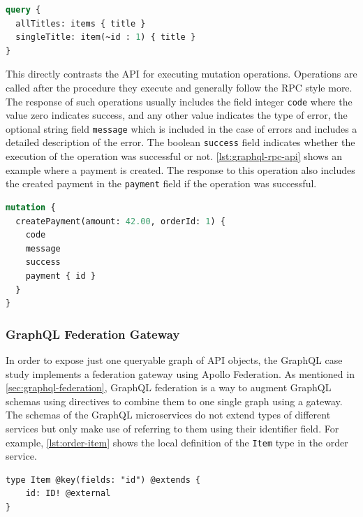 \begin{lstlisting}[caption={Query to Obtain Resources of the GraphQL \acs{API}}, language=graphql, label={lst:graphql-res-api}]
query {
  allTitles: items { title }
  singleTitle: item(~id : 1) { title }
}
\end{lstlisting}

This directly contrasts the \ac{API} for executing mutation operations.
Operations are called after the procedure they execute and generally follow the \ac{RPC} style more.
The response of such operations usually includes the field integer \texttt{code} where the value zero indicates success, and any other value indicates the type of error, the optional string field \texttt{message} which is included in the case of errors and includes a detailed description of the error.
The boolean \texttt{success} field indicates whether the execution of the operation was successful or not.
\autoref{lst:graphql-rpc-api} shows an example where a payment is created.
The response to this operation also includes the created payment in the \texttt{payment} field if the operation was successful.

\begin{lstlisting}[caption={Mutation to Create a Payment in the GraphQL \acs{API}}, language=graphql, label={lst:graphql-rpc-api}]
mutation {
  createPayment(amount: 42.00, orderId: 1) {
    code
    message
    success
    payment { id }
  }
}
\end{lstlisting}

\subsubsection{GraphQL Federation Gateway}

In order to expose just one queryable graph of \ac{API} objects, the GraphQL case study implements a federation gateway using Apollo Federation.
As mentioned in \autoref{sec:graphql-federation}, GraphQL federation is a way to augment GraphQL schemas using directives to combine them to one single graph using a gateway.
The schemas of the GraphQL microservices do not extend types of different services but only make use of referring to them using their identifier field.
For example, \autoref{lst:order-item} shows the local definition of the \texttt{Item} type in the order service.

\begin{lstlisting}[caption={Schema Definition to Enable Federation}, language=graphqls, label={lst:order-item}]
type Item @key(fields: "id") @extends {
    id: ID! @external
}
\end{lstlisting}

